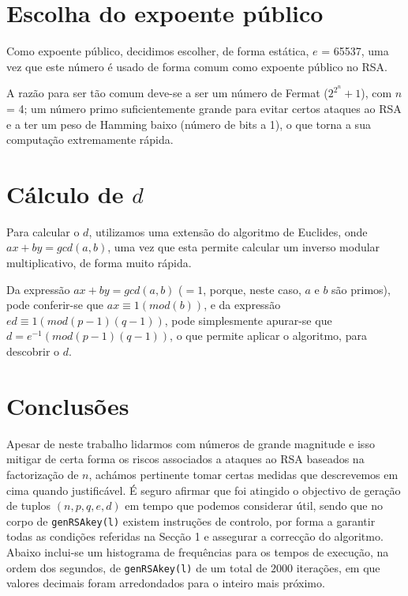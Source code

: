 \documentclass[dvipsnames]{article}
\begin{document}
\begin{multicols}{2}
  \section{Escolha do expoente público}
  Como expoente público, decidimos escolher, de forma estática, $e$ =  65537, uma vez que este número é usado de forma comum como expoente público no RSA.
  
  \vskip 0.4cm
  
  \noindent A razão para ser tão comum deve-se a ser um número de Fermat (${2^{2^n}}+1$), com $n$ = 4; um número primo suficientemente grande para evitar certos ataques ao RSA e a ter um peso de Hamming baixo (número de bits a 1), o que torna a sua computação extremamente rápida.
  
  \section{Cálculo de $d$}
  Para calcular o $d$, utilizamos uma extensão do algoritmo de Euclides, onde $ax + by = gcd(a,b)$, uma vez que esta permite calcular um inverso modular multiplicativo, de forma muito rápida.
  
  \vskip 0.4cm
  
  \noindent Da expressão $ax + by = gcd(a,b)$ ($=1$, porque, neste caso, $a$ e $b$ são primos), pode conferir-se que $ax \equiv 1 (mod (b))$, e da expressão $ed \equiv 1 (mod (p-1)(q-1))$, pode simplesmente apurar-se que $d = e^{-1} (mod (p-1)(q-1))$, o que permite aplicar o algoritmo, para descobrir o $d$.
  
  \section{Conclusões}
  
  Apesar de neste trabalho lidarmos com números de grande magnitude e isso mitigar de certa forma os riscos associados a ataques ao RSA baseados na factorização de $n$, achámos pertinente tomar certas medidas que descrevemos em cima quando justificável. É seguro afirmar que foi atingido o objectivo de geração de tuplos $(n,p,q,e,d)$ em tempo que podemos considerar útil, sendo que no corpo de \texttt{genRSAkey(l)} existem instruções de controlo, por forma a garantir todas as condições referidas na Secção 1 e assegurar a correcção do algoritmo.\\
  
  \noindent Abaixo inclui-se um histograma de frequências para os tempos de execução, na ordem dos segundos, de \texttt{genRSAkey(l)} de um total de $2000$ iterações, em que valores decimais foram arredondados para o inteiro mais próximo.
  

\end{multicols}
\end{document}
